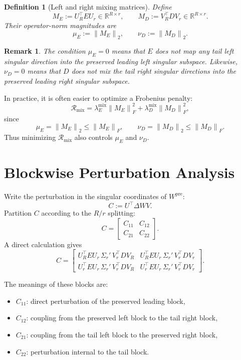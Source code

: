 \documentclass[11pt]{article}
\newtheorem{remark}{Remark}
\newtheorem{definition}{Definition}
\newcommand{\R}{\mathbb{R}}
\newcommand{\fro}[1]{\left\|#1\right\|_F}
\newcommand{\op}[1]{\left\|#1\right\|_2}
\begin{document}
\begin{definition}[Left and right mixing matrices]
Define
\[
M_E := U_R^\top E U_r \in \R^{R\times r},
\qquad
M_D := V_R^\top D V_r \in \R^{R\times r}.
\]
Their operator-norm magnitudes are
\[
\mu_E := \op{M_E},
\qquad
\nu_D := \op{M_D}.
\]
\end{definition}

\begin{remark}
The condition \(\mu_E=0\) means that \(E\) does not map any tail left singular direction into the preserved leading left singular subspace. Likewise, \(\nu_D=0\) means that \(D\) does not mix the tail right singular directions into the preserved leading right singular subspace.
\end{remark}

In practice, it is often easier to optimize a Frobenius penalty:
\[
\mathcal{R}_{\mathrm{mix}}
=
\lambda_E^{\mathrm{mix}} \fro{M_E}^2
+
\lambda_D^{\mathrm{mix}} \fro{M_D}^2,
\]
since
\[
\mu_E = \op{M_E} \le \fro{M_E},
\qquad
\nu_D = \op{M_D} \le \fro{M_D}.
\]
Thus minimizing \(\mathcal{R}_{\mathrm{mix}}\) also controls \(\mu_E\) and \(\nu_D\).

\section{Blockwise Perturbation Analysis}

Write the perturbation in the singular coordinates of \(W^{\mathrm{pre}}\):
\[
C := U^\top \Delta W V.
\]
Partition \(C\) according to the \(R/r\) splitting:
\[
C=
\begin{bmatrix}
C_{11} & C_{12}\\
C_{21} & C_{22}
\end{bmatrix}.
\]
A direct calculation gives
\begin{equation}
\label{eq:block-form}
C
=
\begin{bmatrix}
U_R^\top E U_r\, \Sigma_r' \,V_r^\top D V_R
&
U_R^\top E U_r\, \Sigma_r' \,V_r^\top D V_r
\\[0.75em]
U_r^\top E U_r\, \Sigma_r' \,V_r^\top D V_R
&
U_r^\top E U_r\, \Sigma_r' \,V_r^\top D V_r
\end{bmatrix}.
\end{equation}

The meanings of these blocks are:
\begin{itemize}[leftmargin=2em]
    \item \(C_{11}\): direct perturbation of the preserved leading block,
    \item \(C_{12}\): coupling from the preserved left block to the tail right block,
    \item \(C_{21}\): coupling from the tail left block to the preserved right block,
    \item \(C_{22}\): perturbation internal to the tail block.
\end{itemize}
\end{document}
